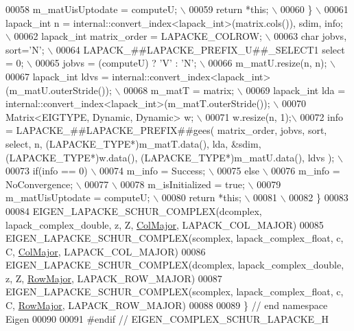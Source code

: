 \begin{DoxyCode}
00058 \textcolor{preprocessor}{      m\_matUisUptodate = computeU; \(\backslash\)}
00059 \textcolor{preprocessor}{      return *this; \(\backslash\)}
00060 \textcolor{preprocessor}{  \} \(\backslash\)}
00061 \textcolor{preprocessor}{  lapack\_int n = internal::convert\_index<lapack\_int>(matrix.cols()), sdim, info; \(\backslash\)}
00062 \textcolor{preprocessor}{  lapack\_int matrix\_order = LAPACKE\_COLROW; \(\backslash\)}
00063 \textcolor{preprocessor}{  char jobvs, sort='N'; \(\backslash\)}
00064 \textcolor{preprocessor}{  LAPACK\_##LAPACKE\_PREFIX\_U##\_SELECT1 select = 0; \(\backslash\)}
00065 \textcolor{preprocessor}{  jobvs = (computeU) ? 'V' : 'N'; \(\backslash\)}
00066 \textcolor{preprocessor}{  m\_matU.resize(n, n); \(\backslash\)}
00067 \textcolor{preprocessor}{  lapack\_int ldvs  = internal::convert\_index<lapack\_int>(m\_matU.outerStride()); \(\backslash\)}
00068 \textcolor{preprocessor}{  m\_matT = matrix; \(\backslash\)}
00069 \textcolor{preprocessor}{  lapack\_int lda = internal::convert\_index<lapack\_int>(m\_matT.outerStride()); \(\backslash\)}
00070 \textcolor{preprocessor}{  Matrix<EIGTYPE, Dynamic, Dynamic> w; \(\backslash\)}
00071 \textcolor{preprocessor}{  w.resize(n, 1);\(\backslash\)}
00072 \textcolor{preprocessor}{  info = LAPACKE\_##LAPACKE\_PREFIX##gees( matrix\_order, jobvs, sort, select, n,
       (LAPACKE\_TYPE*)m\_matT.data(), lda, &sdim, (LAPACKE\_TYPE*)w.data(), (LAPACKE\_TYPE*)m\_matU.data(), ldvs ); \(\backslash\)}
00073 \textcolor{preprocessor}{  if(info == 0) \(\backslash\)}
00074 \textcolor{preprocessor}{    m\_info = Success; \(\backslash\)}
00075 \textcolor{preprocessor}{  else \(\backslash\)}
00076 \textcolor{preprocessor}{    m\_info = NoConvergence; \(\backslash\)}
00077 \textcolor{preprocessor}{\(\backslash\)}
00078 \textcolor{preprocessor}{  m\_isInitialized = true; \(\backslash\)}
00079 \textcolor{preprocessor}{  m\_matUisUptodate = computeU; \(\backslash\)}
00080 \textcolor{preprocessor}{  return *this; \(\backslash\)}
00081 \textcolor{preprocessor}{\(\backslash\)}
00082 \textcolor{preprocessor}{\}}
00083 
00084 EIGEN\_LAPACKE\_SCHUR\_COMPLEX(dcomplex, lapack\_complex\_double, z, Z, \hyperlink{group__enums_ggaacded1a18ae58b0f554751f6cdf9eb13a0cbd4bdd0abcfc0224c5fcb5e4f6669a}{ColMajor}, LAPACK\_COL\_MAJOR)
00085 EIGEN\_LAPACKE\_SCHUR\_COMPLEX(scomplex, lapack\_complex\_float,  c, C, \hyperlink{group__enums_ggaacded1a18ae58b0f554751f6cdf9eb13a0cbd4bdd0abcfc0224c5fcb5e4f6669a}{ColMajor}, LAPACK\_COL\_MAJOR)
00086 EIGEN\_LAPACKE\_SCHUR\_COMPLEX(dcomplex, lapack\_complex\_double, z, Z, \hyperlink{group__enums_ggaacded1a18ae58b0f554751f6cdf9eb13acfcde9cd8677c5f7caf6bd603666aae3}{RowMajor}, LAPACK\_ROW\_MAJOR)
00087 EIGEN\_LAPACKE\_SCHUR\_COMPLEX(scomplex, lapack\_complex\_float,  c, C, \hyperlink{group__enums_ggaacded1a18ae58b0f554751f6cdf9eb13acfcde9cd8677c5f7caf6bd603666aae3}{RowMajor}, LAPACK\_ROW\_MAJOR)
00088 
00089 \} \textcolor{comment}{// end namespace Eigen}
00090 
00091 \textcolor{preprocessor}{#endif // EIGEN\_COMPLEX\_SCHUR\_LAPACKE\_H}
\end{DoxyCode}
